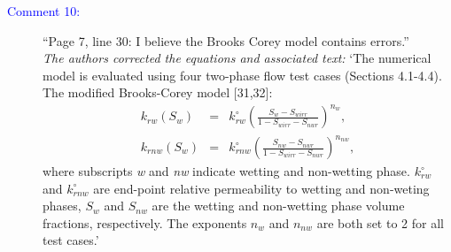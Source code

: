 \documentclass[12pts,a4paper,amsmath,amssymb,floatfix]{article}
\newcommand{\blue}{\textcolor{blue}}
\begin{document}
\begin{description}
\item[\blue{Comment 10:}]``Page 7, line 30: I believe the Brooks Corey model contains errors.''\\
{\it The authors corrected the equations and associated text:} `The numerical model is evaluated using four two-phase flow test cases (Sections 4.1-4.4). The modified Brooks-Corey model [31,32]: 
\begin{eqnarray}
   k_{rw}\left ( S_{w} \right ) &=& k_{rw}^{\circ} \left ( \frac{S_w-S_{wirr}}{1-S_{wirr}-S_{nwr}} \right )^{n_w}, \\
   k_{rnw}\left ( S_{w} \right ) &=& k_{rnw}^{\circ} \left ( \frac{S_{nw}-S_{nwr}}{1-S_{wirr}-S_{nwr}} \right)^{n_{nw}}, 
\end{eqnarray}
where subscripts {\it w} and {\it nw} indicate wetting and non-wetting phase. $k_{rw}^{\circ}$ and $k_{rnw}^{\circ}$ are end-point relative permeability to wetting and non-weting phases, $S_w$ and $S_{nw}$ are the wetting and non-wetting phase volume fractions, respectively. The exponents $n_w$ and $n_{nw}$ are both set to 2 for all test cases.'


\end{description}
\end{document}
